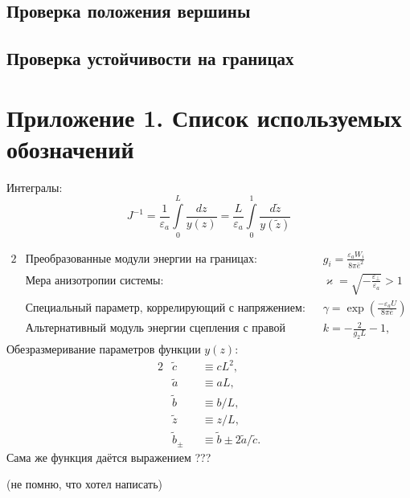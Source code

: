\documentclass[a4paper, 12pt]{extarticle}
\def \ve {\varepsilon}
\def \vk {\varkappa}
\def \tz {\tilde{z}}
\def \ta {\tilde{a}}
\def \tc {\tilde{c}}
\def \tb {\tilde{b}}
\begin{document}
\subsection{Проверка положения вершины}
\subsection{Проверка устойчивости на границах}


\newpage
\section*{Приложение 1. Список используемых обозначений}
Интегралы:
$$
J^{-1} = \frac{1}{\ve_a}\int\limits_0^{L} \frac{dz}{y(z)} = \frac{L}{\ve_a}\int\limits_{0}^{1} \frac{d\tz}{y(\tz)}
$$

\begin{alignat}{2}
	&\text{Преобразованные модули энергии на границах:} &&g_i = \frac{\ve_a W_i}{8\pi\bar{e}^2}\\
	&\text{Мера анизотропии системы:} &&\vk = \sqrt{-\frac{\ve_\perp}{\ve_a}} > 1\\
	&\text{Специальный параметр, коррелирующий с напряжением}: &&\gamma = \exp{\left( \frac{-\ve_a U}{8\pi\bar{e}}	\right)}\label{eq:appendix_gamma_definition}\\
	&\text{Альтернативный модуль энергии сцепления с правой подложкой:} &&k = -\frac{2}{g_2 L} - 1, \label{eq:appendix_k_definition}	
\end{alignat}
Обезразмеривание параметров функции $y(z)$:
\begin{alignat}{2}
	&\tc &&\equiv cL^2,\\
	&\ta &&\equiv aL,\\
	&\tb &&\equiv b/L,\\
	&\tz &&\equiv z/L,\\
	&\tb_\pm &&\equiv \tb \pm 2\ta/\tc.\label{eq:definition_of_b_pm}
\end{alignat}
Сама же функция даётся выражением
???

(не помню, что хотел написать)
\end{document}
